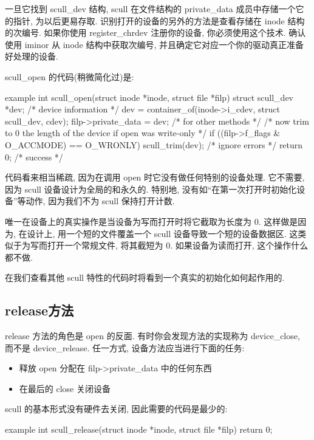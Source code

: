 \documentclass[lang=cn,newtx,10pt,scheme=chinese]{elegantbook}
\begin{document}
一旦它找到 scull\_dev 结构, scull 在文件结构的 private\_data 成员中存储一个它的指针, 为以后更易存取. 识别打开的设备的另外的方法是查看存储在 inode 结构的次编号. 如果你使用
register\_chrdev 注册你的设备, 你必须使用这个技术. 确认使用 iminor 从 inode 结构中获取次编号, 并且确定它对应一个你的驱动真正准备好处理的设备.

scull\_open 的代码(稍微简化过)是:

\begin{mycode}{example}
int scull_open(struct inode *inode, struct file *filp)
{
    struct scull_dev *dev; /* device information */
    dev = container_of(inode->i_cdev, struct scull_dev, cdev);
    filp->private_data = dev; /* for other methods */
    /* now trim to 0 the length of the device if open was write-only */
    if ((filp->f_flags & O_ACCMODE) == O_WRONLY)
    {
        scull_trim(dev); /* ignore errors */
    }
    return 0; /* success */
}
\end{mycode}

代码看来相当稀疏, 因为在调用 open 时它没有做任何特别的设备处理. 它不需要, 因为 scull 设备设计为全局的和永久的. 特别地, 没有如``在第一次打开时初始化设备''等动作, 因为我们不为 scull 保持打开计数.

唯一在设备上的真实操作是当设备为写而打开时将它截取为长度为 0. 这样做是因为, 在设计上, 用一个短的文件覆盖一个 scull 设备导致一个短的设备数据区. 这类似于为写而打开一个常规文件, 将其截短为 0. 如果设备为读而打开, 这个操作什么都不做.

在我们查看其他 scull 特性的代码时将看到一个真实的初始化如何起作用的.

\subsection{release方法}

release 方法的角色是 open 的反面. 有时你会发现方法的实现称为 device\_close, 而不是 device\_release. 任一方式, 设备方法应当进行下面的任务:

\begin{itemize}
\item 释放 open 分配在 filp->private\_data 中的任何东西
\item 在最后的 close 关闭设备
\end{itemize}

scull 的基本形式没有硬件去关闭, 因此需要的代码是最少的:

\begin{mycode}{example}
    int scull_release(struct inode *inode, struct file *filp)
    {
        return 0;
    }
\end{mycode}
\end{document}
